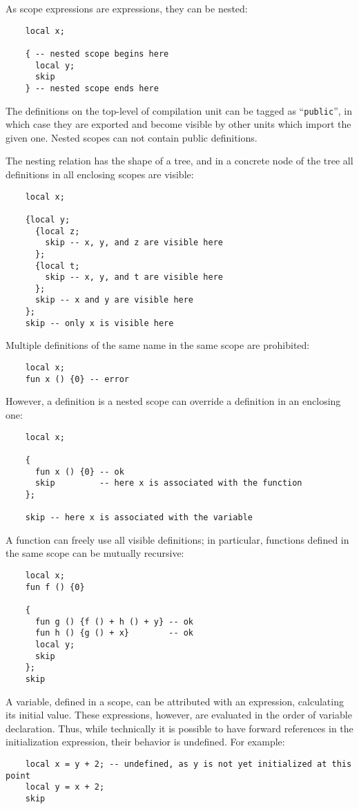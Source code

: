 As scope expressions are expressions, they can be nested:

\begin{lstlisting}
    local x;

    { -- nested scope begins here
      local y;
      skip
    } -- nested scope ends here
\end{lstlisting}

The definitions on the top-level of compilation unit can be tagged as ``\lstinline|public|'', in which case they are exported and become visible by
other units which import the given one. Nested scopes can not contain public definitions.

The nesting relation has the shape of a tree, and in a concrete node of the tree all definitions in all enclosing scopes are visible:

\begin{lstlisting}
    local x;

    {local y; 
      {local z;
        skip -- x, y, and z are visible here
      };
      {local t;
        skip -- x, y, and t are visible here
      };
      skip -- x and y are visible here
    };
    skip -- only x is visible here
\end{lstlisting}

Multiple definitions of the same name in the same scope are prohibited:

\begin{lstlisting}
    local x;
    fun x () {0} -- error
\end{lstlisting}

However, a definition is a nested scope can override a definition in an enclosing one:

\begin{lstlisting}
    local x;

    {
      fun x () {0} -- ok
      skip         -- here x is associated with the function
    };

    skip -- here x is associated with the variable
\end{lstlisting}

A function can freely use all visible definitions; in particular, functions defined in the
same scope can be mutually recursive:

\begin{lstlisting}
    local x;
    fun f () {0}

    { 
      fun g () {f () + h () + y} -- ok
      fun h () {g () + x}        -- ok
      local y;
      skip
    };
    skip
\end{lstlisting}

A variable, defined in a scope, can be attributed with an expression, calculating its initial value.
These expressions, however, are evaluated in the order of variable declaration. Thus, while
technically it is possible to have forward references in the initialization expression, their
behavior is undefined. For example:

\begin{lstlisting}
    local x = y + 2; -- undefined, as y is not yet initialized at this point
    local y = x + 2;
    skip
\end{lstlisting}
